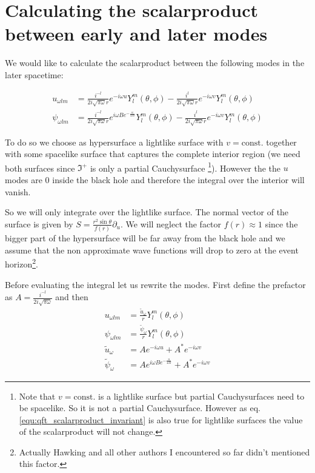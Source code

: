 \section{Calculating the scalarproduct between early and later modes}
\label{sec:app_scalarproduct}
We would like to calculate the scalarproduct between the following modes in the later spacetime:

\begin{align}
u_{\omega l m} &= \frac{i^{-l}}{2i\sqrt{\pi\omega}r} e^{-i\omega u} Y_l^m (\theta, \phi) - \frac{i^{l}}{2i\sqrt{\pi\omega}r} e^{-i\omega v} Y_l^m (\theta, \phi)\\
\psi_{\omega l m} &= \frac{i^{-l}}{2i\sqrt{\pi\omega}r} e^{i\omega B e^{-\frac{u}{4M}}} Y_l^m (\theta, \phi) - \frac{i^{l}}{2i\sqrt{\pi\omega}r} e^{-i\omega v} Y_l^m (\theta, \phi)
\end{align}

To do so we choose as hypersurface a lightlike surface with \(v = \mathrm{const}.\) together with some spacelike surface that captures the complete interior region (we need both surfaces since \(\Im^+\) is only a partial Cauchysurface \footnote{Note that \(v = \mathrm{const}.\) is a lightlike surface but partial Cauchysurfaces need to be spacelike. So it is not a partial Cauchysurface. However as eq. \ref{equ:qft_scalarproduct_invariant} is also true for lightlike surfaces the value of the scalarproduct will not change.}). However the the \(u\) modes are \(0\) inside the black hole and therefore the integral over the interior will vanish.

So we will only integrate over the lightlike surface. The normal vector of the surface is given by \(S = \frac{r^2 \sin\theta}{f(r)} \partial_u\). We will neglect the factor \(f(r) \approx 1\) since the bigger part of the hypersurface will be far away from the black hole and we assume that the non approximate wave functions will drop to zero at the event horizon\footnote{Actually Hawking and all other authors I encountered so far didn't mentioned this factor.}.

Before evaluating the integral let us rewrite the modes. First define the prefactor as \(A = \frac{i^{-l}}{2i\sqrt{\pi\omega}}\) and then  
\begin{align}
u_{\omega l m} &= \frac{\tilde{u}_\omega}{r} Y_l^m (\theta, \phi)\\
\psi_{\omega l m} &= \frac{\tilde{\psi}_\omega}{r} Y_l^m (\theta, \phi)\\
\tilde{u}_{\omega} &= A e^{-i\omega u} + A^* e^{-i\omega v}\\
\tilde{\psi}_{\omega} &= A e^{i\omega B e^{-\frac{u}{4M}}} + A^* e^{-i\omega v}
\end{align}

